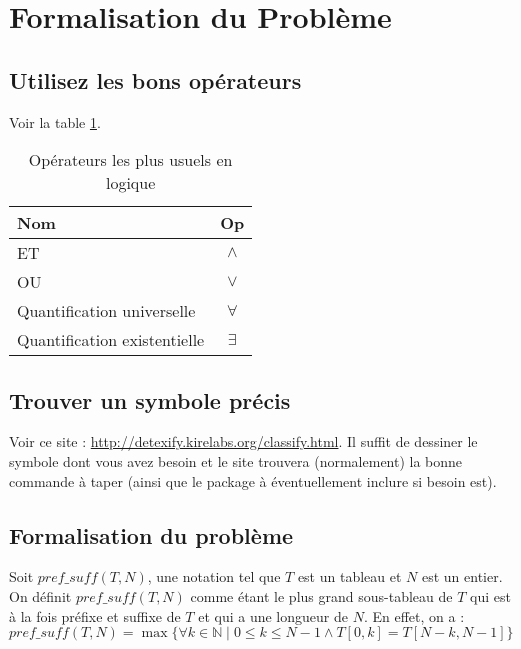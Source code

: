 \section{Formalisation du Problème}\label{formalisation}

\subsection{Utilisez les bons opérateurs}

Voir la table \ref{table:op}.

\begin{table}[!h]
\centering
\begin{tabular}{l c}
Nom & Op \\
\hline
ET & $\land$ \\
OU & $\lor$ \\
Quantification universelle & $\forall$ \\
Quantification existentielle & $\exists$ \\
\end{tabular}
\caption{Opérateurs les plus usuels en logique}
\label{table:op}
\end{table}

\subsection{Trouver un symbole précis}

Voir ce site : \url{http://detexify.kirelabs.org/classify.html}. Il suffit de dessiner le symbole dont vous avez besoin et le site trouvera (normalement) la bonne commande à taper (ainsi que le package à éventuellement inclure si besoin est).

\subsection{Formalisation du problème}
Soit $pref\_suff(T, N)$, une notation tel que $T$ est un tableau et $N$ est un entier. On définit $pref\_suff(T, N)$ comme étant le plus grand sous-tableau de $T$ qui est à la fois préfixe et suffixe de $T$ et qui a une longueur de $N$. En effet, on a :
\begin{equation}
   pref\_suff(T, N) = \max \{\forall k \in \mathbb{N} \mid 0 \leq k \leq N-1 \land T[0, k] = T[N-k, N-1]\}
\end{equation}